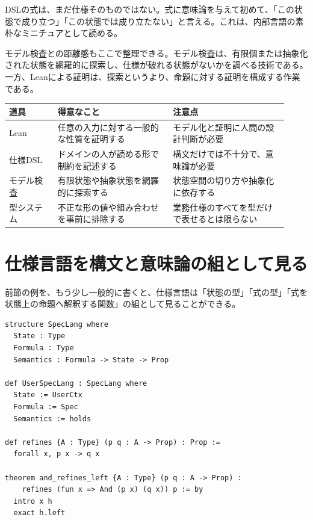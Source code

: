 \begin{intuitionbox}
DSLの式は、まだ仕様そのものではない。式に意味論を与えて初めて、「この状態で成り立つ」「この状態では成り立たない」と言える。これは、内部言語の素朴なミニチュアとして読める。
\end{intuitionbox}

モデル検査との距離感もここで整理できる。モデル検査は、有限個または抽象化された状態を網羅的に探索し、仕様が破れる状態がないかを調べる技術である。一方、Leanによる証明は、探索というより、命題に対する証明を構成する作業である。

\begin{center}
\begin{tabular}{@{}p{0.16\linewidth}p{0.38\linewidth}p{0.38\linewidth}@{}}
\toprule
道具 & 得意なこと & 注意点 \\
\midrule
Lean & 任意の入力に対する一般的な性質を証明する & モデル化と証明に人間の設計判断が必要 \\
仕様DSL & ドメインの人が読める形で制約を記述する & 構文だけでは不十分で、意味論が必要 \\
モデル検査 & 有限状態や抽象状態を網羅的に探索する & 状態空間の切り方や抽象化に依存する \\
型システム & 不正な形の値や組み合わせを事前に排除する & 業務仕様のすべてを型だけで表せるとは限らない \\
\bottomrule
\end{tabular}
\end{center}


\section{仕様言語を構文と意味論の組として見る}

前節の例を、もう少し一般的に書くと、仕様言語は「状態の型」「式の型」「式を状態上の命題へ解釈する関数」の組として見ることができる。

\begin{listing}[htbp]
\begin{verbatim}
structure SpecLang where
  State : Type
  Formula : Type
  Semantics : Formula -> State -> Prop

def UserSpecLang : SpecLang where
  State := UserCtx
  Formula := Spec
  Semantics := holds

def refines {A : Type} (p q : A -> Prop) : Prop :=
  forall x, p x -> q x

theorem and_refines_left {A : Type} (p q : A -> Prop) :
    refines (fun x => And (p x) (q x)) p := by
  intro x h
  exact h.left
\end{verbatim}
\caption{仕様言語を構文と意味論の組として表す}
\label{lst:ch33_spec_lang}
\end{listing}

